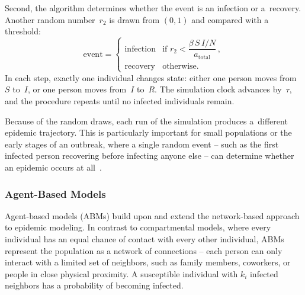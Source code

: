 \documentclass[english]{projectreport}
\begin{document}
Second, the algorithm determines whether the event is an infection or
a~recovery. Another random number~$r_2$ is drawn from $(0,1)$ and
compared with a threshold:
\begin{equation}
  \text{event} =
  \begin{cases}
    \text{infection}  & \text{if } r_2 < \dfrac{\beta\, S\, I / N}
                        {a_{\text{total}}}\,,\\[6pt]
    \text{recovery}   & \text{otherwise.}
  \end{cases}
  \label{eq:event-selection}
\end{equation}
In each step, exactly one individual changes state: either one person
moves from~$S$ to~$I$, or one person moves from~$I$ to~$R$. The
simulation clock advances by~$\tau$, and the procedure repeats until no
infected individuals remain.

Because of the random draws, each run of the simulation produces
a~different epidemic trajectory. This is particularly important for small
populations or the early stages of an outbreak, where a single random
event -- such as the first infected person recovering before infecting
anyone else -- can determine whether an epidemic occurs at
all~\cite{allen2017primer}.

\subsubsection{Agent-Based Models}
\label{sec:abm}

Agent-based models (ABMs) build upon and extend the network-based
approach to epidemic modeling. In contrast to compartmental models, where
every individual has an equal chance of contact with every other
individual, ABMs represent the population as a network of connections --
each person can only interact with a limited set of neighbors, such as
family members, coworkers, or people in close physical proximity. A
susceptible individual with $k_i$ infected neighbors has a probability of
becoming infected.
\end{document}
